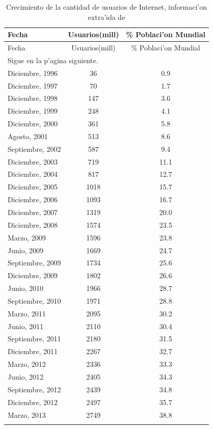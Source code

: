 \begin{longtable}{l c c}
\hline
 Fecha & Usuarios(mill) & \% Poblaci'on Mundial\\
\hline \hline
\endfirsthead

\hline
 Fecha & Usuarios(mill) & \% Poblaci'on Mundial\\
\hline \hline
\endhead

\multicolumn{3}{l}{Sigue en la p'agina siguiente.}
\endfoot

\endlastfoot

\hline
Diciembre, 1995 & 16 & 0.4 \\
Diciembre, 1996 & 36 & 0.9 \\
Diciembre, 1997 & 70 & 1.7 \\
Diciembre, 1998 & 147 & 3.6 \\
Diciembre, 1999 & 248 & 4.1 \\
Diciembre, 2000 & 361 & 5.8 \\
Agosto, 2001 & 513 & 8.6 \\
Septiembre, 2002 & 587 & 9.4 \\
Diciembre,  2003 & 719 & 11.1 \\
Diciembre,  2004 & 817 & 12.7 \\
Diciembre,  2005 & 1018 & 15.7 \\
Diciembre, 2006 & 1093 & 16.7 \\
Diciembre, 2007 & 1319 & 20.0 \\
Diciembre, 2008 & 1574 & 23.5 \\
Marzo, 2009 & 1596 & 23.8 \\
Junio, 2009 & 1669 & 24.7 \\
Septiembre, 2009 & 1734 & 25.6 \\
Diciembre, 2009 & 1802 & 26.6 \\
Junio, 2010 & 1966 & 28.7 \\
Septiembre, 2010 & 1971 & 28.8 \\
Marzo, 2011 & 2095 & 30.2 \\
Junio, 2011 & 2110 & 30.4 \\
Septiembre, 2011 & 2180 & 31.5 \\
Diciembre, 2011 & 2267 & 32.7 \\
Marzo, 2012 & 2336 & 33.3 \\
Junio, 2012 & 2405 & 34.3 \\
Septiembre, 2012 & 2439 & 34.8 \\
Diciembre, 2012 & 2497 & 35.7 \\
Marzo, 2013 & 2749 & 38.8 \\
\hline
\caption{Crecimiento de la cantidad de usuarios de Internet, informaci'on extra'ida de \cite{iws}}
\label{cuadroCrecInternet}
\end{longtable}

